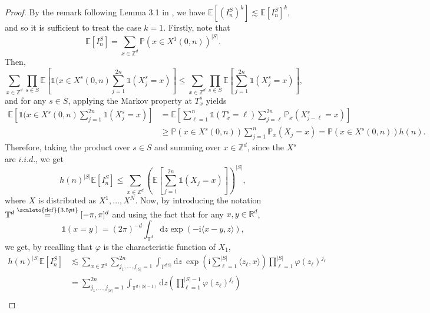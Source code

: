 \documentclass[12pt]{article}
\newcommand{\RR}{\mathbb R}
\newcommand{\EE}{\mathbb E}
\newcommand{\TT}{\mathbb T}
\newcommand{\PP}{\mathbb P}
\newcommand{\1}{\mathds{1}}
\newcommand{\ZZ}{\mathbb Z}
\renewcommand{\d}{\mathrm d}
\renewcommand{\i}{\mathrm i}
\newcommand{\eqdef}{\stackrel{\scaleto{\mathrm{def}}{3.5pt}}{=}}
\numberwithin{equation}{section}
\begin{document}
\begin{proof}
    By the remark following Lemma 3.1 in \cite{LeGallRosenRangeOfStableRandomWalks1991}, we have $\EE\left[(I_n^S)^k\right]\lesssim\EE\left[I_n^S\right]^k$, and so it is sufficient to treat the case $k=1$. Firstly, note that
    \begin{equation*}
        \EE\left[I_n^S\right]=\sum_{x\in\ZZ^d}\PP\left(x\in X^1(0,n)\right)^{|S|}.
    \end{equation*}
    Then, 
    \begin{equation}
    \label{ineq:easy bound for inequality of moments of intersections}
        \sum_{x\in\ZZ^d}\prod_{s\in S}\EE\left[\1(x\in X^s(0,n)\sum_{j=1}^{2n}\1(X_j^s=x)\right]\le \sum_{x\in\ZZ^d}\prod_{s\in S}\EE\left[\sum_{j=1}^{2n}\1\left(X_j^s=x\right)\right],
    \end{equation}
    and for any $s\in S$, applying the Markov property at $T_x^s$ yields
    \begin{align*}
        \EE\left[\1(x\in X^s(0,n)\sum_{j=1}^{2n}\1(X_j^s=x)\right]&=\EE\left[\sum_{\ell=1}^n\1\left(T_x^s=\ell\right)\sum_{j=\ell}^{2n}\PP_x\left(X_{j-\ell}^s=x\right)\right]\\
        &\ge\PP\left(x\in X^s(0,n)\right)\sum_{j=1}^n\PP_x\left(X_j=x\right)=\PP\left(x\in X^s(0,n)\right) h(n).
    \end{align*}
    Therefore, taking the product over $s\in S$ and summing over $x\in\ZZ^d$, since the $X^s$ are $i.i.d.$, we get 
    \begin{equation*}
        h(n)^{|S|}\EE\left[I_n^S\right]\le\sum_{x\in\ZZ^d}\left(\EE\left[\sum_{j=1}^{2n}\1\left(X_j=x\right)\right]\right)^{|S|},
    \end{equation*}
    where $X$ is distributed as $X^1,\dots,X^N$. Now, by introducing the notation $\TT^d\eqdef[-\pi,\pi]^d$ and using the fact that for any $x,y\in\RR^d$, 
    \begin{equation*}
        \1(x=y)=(2\pi)^{-d}\int_{\TT^d}\d z\exp\left(-\i\langle x-y,z\rangle\right),
    \end{equation*}
    we get, by recalling that $\varphi$ is the characteristic function of $X_1$, 
    \begin{align*}
        h(n)^{|S|}\EE\left[I_n^S\right]&\lesssim\sum_{x\in\ZZ^d}\sum_{j_1,\dots,j_{|S|}=1}^{2n}\int_{\TT^{d|S|}}\d z\ \exp\left(\i\sum_{\ell=1}^{|S|}\langle z_\ell, x\rangle\right)\prod_{\ell=1}^{|S|}\varphi(z_\ell)^{j_\ell}\\
        &=\sum_{j_1,\dots,j_{|S|}=1}^{2n}\int_{\TT^{d(|S|-1)}}\d z\left(\prod_{\ell=1}^{|S|-1}\varphi(z_\ell)^{j_\ell}\right)\\

\end{align*}
\end{proof}
\end{document}
